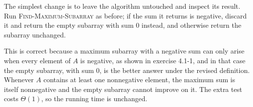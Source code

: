 The simplest change is to leave the algorithm untouched and inspect its result.
Run \textsc{Find-Maximum-Subarray} as before; if the sum it returns is negative,
discard it and return the empty subarray with sum 0 instead, and otherwise
return the subarray unchanged.

This is correct because a maximum subarray with a negative sum can only arise
when every element of $A$ is negative, as shown in exercise 4.1-1, and in that
case the empty subarray, with sum 0, is the better answer under the revised
definition. Whenever $A$ contains at least one nonnegative element, the maximum
sum is itself nonnegative and the empty subarray cannot improve on it. The extra
test costs $\Theta(1)$, so the running time is unchanged.
